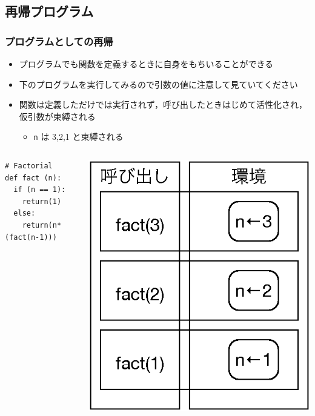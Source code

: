 \subsection{再帰プログラム}
\begin{frame}[fragile]
\frametitle{プログラムとしての再帰}
  \begin{itemize}
\item プログラムでも関数を定義するときに自身をもちいることができる
\item 下のプログラムを実行してみるので引数の値に注意して見ていてください
\item 関数は定義しただけでは実行されず，呼び出したときはじめて活性化され，仮引数が束縛される
    \begin{itemize}
\item {\tt n} は 3,2,1 と束縛される
    \end{itemize}
  \end{itemize}
  \begin{columns}[c]
    \begin{column}{0.6\textwidth}
      \begin{lstlisting}[caption={fact.py},label=fact-with-puts]
# Factorial
def fact (n):
  if (n == 1):
    return(1)
  else:
    return(n*(fact(n-1)))
      \end{lstlisting}
    \end{column}
    \begin{column}{0.35\textwidth}
      \begin{center}
\includegraphics[scale=0.3]{./Figure/elementaryCS-2nd-figStack.eps}
      \end{center}
    \end{column}
  \end{columns}
\end{frame}
